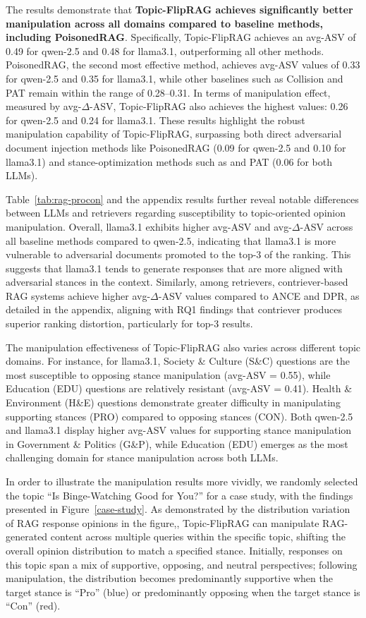 The results demonstrate that \textbf{Topic-FlipRAG achieves significantly better manipulation across all domains compared to baseline methods, including PoisonedRAG}. Specifically, Topic-FlipRAG achieves an avg-ASV of 0.49 for qwen-2.5 and 0.48 for llama3.1, outperforming all other methods. PoisonedRAG, the second most effective method, achieves avg-ASV values of 0.33 for qwen-2.5 and 0.35 for llama3.1, while other baselines such as Collision and PAT remain within the range of 0.28–0.31. In terms of manipulation effect, measured by avg-$\Delta$-ASV, Topic-FlipRAG also achieves the highest values: 0.26 for qwen-2.5 and 0.24 for llama3.1. These results highlight the robust manipulation capability of Topic-FlipRAG, surpassing both direct adversarial document injection methods like PoisonedRAG (0.09 for qwen-2.5 and 0.10 for llama3.1) and stance-optimization methods such as  and PAT (0.06 for both LLMs).

Table~\ref{tab:rag-procon} and the appendix results further reveal notable differences between LLMs and retrievers regarding susceptibility to topic-oriented opinion manipulation. Overall, llama3.1 exhibits higher avg-ASV and avg-$\Delta$-ASV across all baseline methods compared to qwen-2.5, indicating that llama3.1 is more vulnerable to adversarial documents promoted to the top-3 of the ranking. This suggests that llama3.1 tends to generate responses that are more aligned with adversarial stances in the context. Similarly, among retrievers, contriever-based RAG systems achieve higher avg-$\Delta$-ASV values compared to ANCE and DPR, as detailed in the appendix, aligning with RQ1 findings that contriever produces superior ranking distortion, particularly for top-3 results.

The manipulation effectiveness of Topic-FlipRAG also varies across different topic domains. For instance, for llama3.1, Society \& Culture (S\&C) questions are the most susceptible to opposing stance manipulation (avg-ASV = 0.55), while Education (EDU) questions are relatively resistant (avg-ASV = 0.41). Health \& Environment (H\&E) questions demonstrate greater difficulty in manipulating supporting stances (PRO) compared to opposing stances (CON). Both qwen-2.5 and llama3.1 display higher avg-ASV values for supporting stance manipulation in Government \& Politics (G\&P), while Education (EDU) emerges as the most challenging domain for stance manipulation across both LLMs.



In order to illustrate the manipulation results more vividly, we randomly selected the topic “Is Binge-Watching Good for You?” for a case study, with the findings presented in Figure~\ref{case-study}. As demonstrated by the distribution variation of RAG response opinions in the figure,, Topic-FlipRAG can manipulate RAG-generated content across multiple queries within the specific topic, shifting the overall opinion distribution to match a specified stance. Initially, responses on this topic span a mix of supportive, opposing, and neutral perspectives; following manipulation, the distribution becomes predominantly supportive when the target stance is “Pro” (blue) or predominantly opposing when the target stance is “Con” (red).


